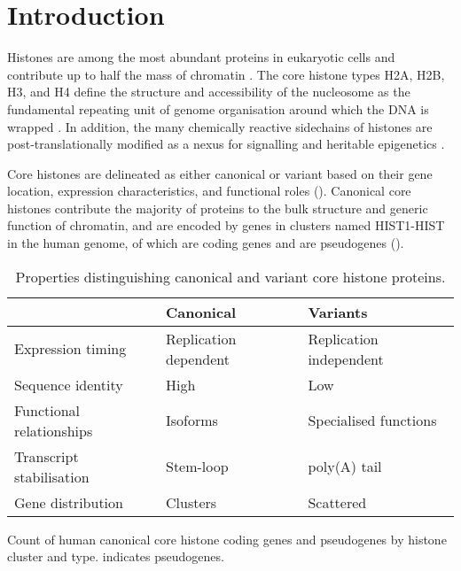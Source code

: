\section{Introduction}

  Histones are among the most abundant proteins in eukaryotic cells
  and contribute up to half the mass of chromatin \citep{AlbertsMBoC}.
  The core histone types H2A, H2B, H3, and H4
  define the structure and accessibility of the nucleosome
  as the fundamental repeating unit of genome organisation
  around which the DNA is wrapped \citep{Luger1997structure}.
  In addition, the many chemically reactive sidechains of histones
  are post-translationally modified
  as a nexus for signalling and heritable epigenetics \citep{Kouzarides2007}.

  Core histones are delineated as either canonical or variant based on
  their gene location, expression characteristics,
  and functional roles ().
  Canonical core histones contribute the majority of proteins to
  the bulk structure and generic function of chromatin,
  and are encoded by \TotalCoreGenes{} genes in \NumberOfClusters{}
  clusters named HIST1-HIST\NumberOfClusters{} in the human genome,
  of which \TotalCoreCodingGenes{} are coding genes and \TotalCorePseudoGenes{}
  are pseudogenes ().

  \begin{table}
    \caption{Properties distinguishing canonical and variant core histone proteins.}
    \label{tab:typical-histone-differences}
    \centering
    \begin{tabular}{l l l}
      \toprule
      \null                     & Canonical             & Variants \\
      \midrule
      Expression timing         & Replication dependent & Replication independent \\
      Sequence identity         & High                  & Low \\
      Functional relationships  & Isoforms              & Specialised functions \\
      Transcript stabilisation  & Stem-loop             & poly(A) tail \\
      Gene distribution         & Clusters              & Scattered \\
      \bottomrule
    \end{tabular}
  \end{table}

  \begin{table}
    \caption{Count of human canonical core histone coding genes and pseudogenes
             by histone cluster and type.  \textpsi{} indicates pseudogenes.}
    \label{tab:histone-gene-count}
    \centering
    
  \end{table}

